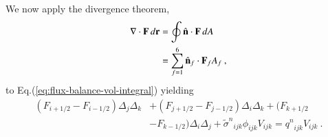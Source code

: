 \documentclass[preprint,12pt]{elsarticle}
\newcommand{\sign}{\ensuremath{\tilde{\sigma}^n}}
\newcommand{\qn}{\ensuremath{q^n}} \newcommand{\Tn}{\ensuremath{T^n}}
\newcommand{\Di}{\ensuremath{\Delta_i}}
\newcommand{\Dj}{\ensuremath{\Delta_j}}
\newcommand{\Dk}{\ensuremath{\Delta_k}}
\begin{document}
We now apply the divergence theorem,
\begin{equation}
  \begin{split}
    \relax\nabla\cdot\mathbf{F}\,d\mathbf{r} &= \oint\hat{\mathbf{n}}\cdot\mathbf{F}\,dA\\ &=
    \sum_{f=1}^{6}\hat{\mathbf{n}}_f\cdot\mathbf{F}_f A_f\:,
  \end{split}
\end{equation}
to Eq.(\ref{eq:flux-balance-vol-integral}) yielding
\begin{equation}
  \begin{split}
    (F_{i+1/2} - F_{i-1/2})\Dj\Dk &+ (F_{j+1/2} - F_{j-1/2})\Di\Dk +
    (F_{k+1/2}\\ &- F_{k-1/2})\Di\Dj + \sign_{ijk}\phi_{ijk}V_{ijk} =
    \qn_{ijk}V_{ijk}\:.
  \end{split}
  \label{eq:flux-balance-difference}
\end{equation}
\end{document}
